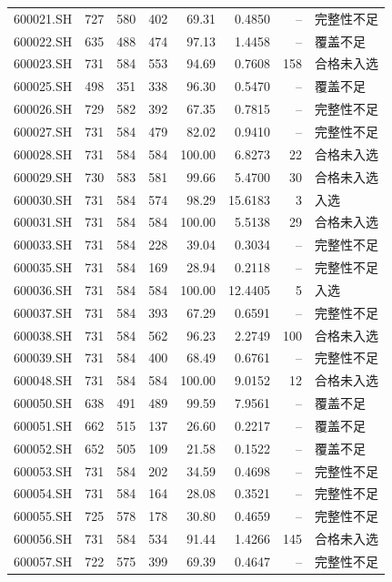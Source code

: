 \documentclass[10pt,a4paper]{article}
\begin{document}
\begin{longtable}{lrrr r r r l}
600021.SH & 727 & 580 & 402 & 69.31 & 0.4850 & -- & 完整性不足\\
600022.SH & 635 & 488 & 474 & 97.13 & 1.4458 & -- & 覆盖不足\\
600023.SH & 731 & 584 & 553 & 94.69 & 0.7608 & 158 & 合格未入选\\
600025.SH & 498 & 351 & 338 & 96.30 & 0.5470 & -- & 覆盖不足\\
600026.SH & 729 & 582 & 392 & 67.35 & 0.7815 & -- & 完整性不足\\
600027.SH & 731 & 584 & 479 & 82.02 & 0.9410 & -- & 完整性不足\\
600028.SH & 731 & 584 & 584 & 100.00 & 6.8273 & 22 & 合格未入选\\
600029.SH & 730 & 583 & 581 & 99.66 & 5.4700 & 30 & 合格未入选\\
600030.SH & 731 & 584 & 574 & 98.29 & 15.6183 & 3 & 入选\\
600031.SH & 731 & 584 & 584 & 100.00 & 5.5138 & 29 & 合格未入选\\
600033.SH & 731 & 584 & 228 & 39.04 & 0.3034 & -- & 完整性不足\\
600035.SH & 731 & 584 & 169 & 28.94 & 0.2118 & -- & 完整性不足\\
600036.SH & 731 & 584 & 584 & 100.00 & 12.4405 & 5 & 入选\\
600037.SH & 731 & 584 & 393 & 67.29 & 0.6591 & -- & 完整性不足\\
600038.SH & 731 & 584 & 562 & 96.23 & 2.2749 & 100 & 合格未入选\\
600039.SH & 731 & 584 & 400 & 68.49 & 0.6761 & -- & 完整性不足\\
600048.SH & 731 & 584 & 584 & 100.00 & 9.0152 & 12 & 合格未入选\\
600050.SH & 638 & 491 & 489 & 99.59 & 7.9561 & -- & 覆盖不足\\
600051.SH & 662 & 515 & 137 & 26.60 & 0.2217 & -- & 覆盖不足\\
600052.SH & 652 & 505 & 109 & 21.58 & 0.1522 & -- & 覆盖不足\\
600053.SH & 731 & 584 & 202 & 34.59 & 0.4698 & -- & 完整性不足\\
600054.SH & 731 & 584 & 164 & 28.08 & 0.3521 & -- & 完整性不足\\
600055.SH & 725 & 578 & 178 & 30.80 & 0.4659 & -- & 完整性不足\\
600056.SH & 731 & 584 & 534 & 91.44 & 1.4266 & 145 & 合格未入选\\
600057.SH & 722 & 575 & 399 & 69.39 & 0.4647 & -- & 完整性不足\\

\end{longtable}
\end{document}
